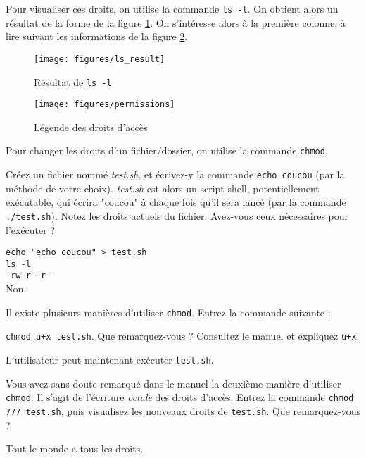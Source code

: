 \documentclass{scrartcl}
\begin{document}
Pour visualiser ces droits, on utilise la commande \lstinline|ls -l|. On obtient alors un résultat de la forme de la figure \ref{fig:ls_result}. On s'intéresse alors à la première colonne, à lire suivant les informations de la figure \ref{fig:permissions}.

\begin{figure}[h]
  \centering
  \texttt{[image: figures/ls\_result]}
  \caption{Résultat de \lstinline|ls -l|}
  \label{fig:ls_result}
\end{figure}

\begin{figure}[h]
  \centering
  \texttt{[image: figures/permissions]}
  \caption{Légende des droits d'accès}
  \label{fig:permissions}
\end{figure}

Pour changer les droits d'un fichier/dossier, on utilise la commande \lstinline|chmod|.

\begin{question}[name=Q.]
	Créez un fichier nommé \emph{test.sh}, et écrivez-y la commande \lstinline|echo coucou| (par la méthode de votre choix). \emph{test.sh} est alors un script shell, potentiellement exécutable, qui écrira "coucou" à chaque fois qu'il sera lancé (par la commande \lstinline|./test.sh|).
	Notez les droits actuels du fichier. Avez-vous ceux nécessaires pour l’exécuter ?
\end{question}
\begin{solution}
	\lstinline|echo "echo coucou" > test.sh|\\
	\lstinline|ls -l|\\
	\lstinline|-rw-r--r--|\\
	Non.
\end{solution}

\begin{question}[name=Q.]
	Il existe plusieurs manières d'utiliser \lstinline|chmod|. Entrez la commande suivante :

	\lstinline|chmod u+x test.sh|. Que remarquez-vous ? Consultez le manuel et expliquez \lstinline|u+x|.
\end{question}
\begin{solution}
	L'utilisateur peut maintenant exécuter \lstinline|test.sh|.
\end{solution}

\begin{question}[name=Q.]
	Vous avez sans doute remarqué dans le manuel la deuxième manière d'utiliser \lstinline|chmod|. Il s'agit de l'écriture \emph{octale} des droits d'accès. Entrez la commande \lstinline|chmod 777 test.sh|, puis visualisez les nouveaux droits de \lstinline|test.sh|. Que remarquez-vous ?
\end{question}
\begin{solution}
	Tout le monde a tous les droits.
	\clearpage
\end{solution}
\end{document}
